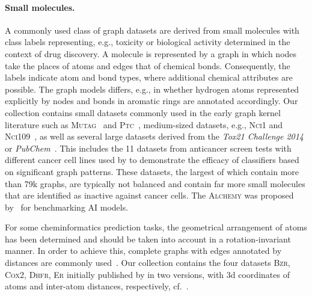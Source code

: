 \documentclass{article}
\theoremstyle{definition}
\begin{document}
\paragraph{Small molecules.} 
A commonly used class of graph datasets are derived from small molecules with class labels representing, e.g., toxicity or biological activity determined in the context of drug discovery. A molecule is represented by a graph in which nodes take the places of atoms and edges that of chemical bonds. Consequently, the labels indicate atom and bond types, where additional chemical attributes are possible. The graph models differs, e.g., in whether hydrogen atoms represented explicitly by nodes and bonds in aromatic rings are annotated accordingly.
Our collection contains small datasets commonly used in the early graph kernel literature such as \textsc{Mutag}~\citep{Deb+1991} and \textsc{Ptc}~\cite{Helma2001}, medium-sized datasets, e.g., \textsc{Nci1} and \textsc{Nci109}~\citep{Wal+2008,She+2011}, as well as several large datasets derived from the \emph{Tox21 Challenge 2014} or \emph{PubChem}~\citep{Kim2018}. This includes the 11 datasets from anticancer screen tests with different cancer cell lines used by \citet{Yan2008} to demonstrate the efficacy of classifiers based on significant graph patterns. These datasets, the largest of which contain more than 79k graphs, are typically not balanced and contain far more small molecules that are identified as inactive against cancer cells.
The \textsc{Alchemy} was proposed by~\citet{Chen2019a} for benchmarking {AI} models.

For some cheminformatics prediction tasks, the geometrical arrangement of atoms has been determined and should be taken into account in a rotation-invariant manner. In order to achieve this, complete graphs with edges annotated by distances are commonly used~\citep{Kri+2012,Gil+2017}. Our collection contains the four datasets \textsc{Bzr}, \textsc{Cox2}, \textsc{Dhfr}, \textsc{Er} initially published by \citet{Sut+2003} in two versions, with 3d coordinates of atoms and inter-atom distances, respectively, cf.~\citep{Mah+2006,Kri+2012}.
\end{document}
